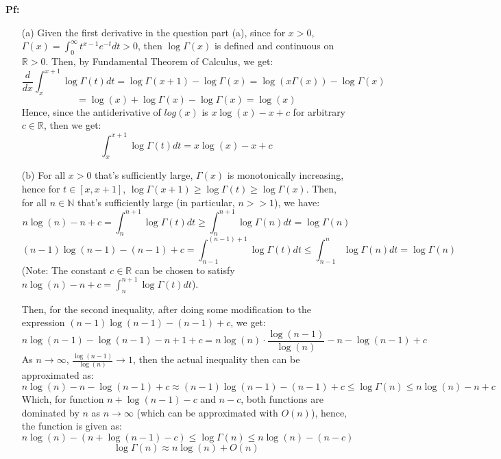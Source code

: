 \documentclass{article}
\begin{document}
\textbf{Pf:}

\begin{itemize}
    \item[(a)] Given the first derivative in the question part (a), since for $x>0$, $\Gamma(x)=\int_{0}^{\infty}t^{x-1}e^{-t}dt>0$, then $\log\Gamma(x)$ is defined and continuous on $\mathbb{R}>0$. Then, by Fundamental Theorem of Calculus, we get:
    $$\frac{d}{dx}\int_{x}^{x+1}\log\Gamma(t)dt = \log\Gamma(x+1)-\log\Gamma(x) = \log(x\Gamma(x))-\log\Gamma(x)$$
    $$= \log(x)+\log\Gamma(x)-\log\Gamma(x)=\log(x)$$
    Hence, since the antiderivative of $log(x)$ is $x\log(x)-x+c$ for arbitrary $c\in\mathbb{R}$, then we get:
    $$\int_{x}^{x+1}\log\Gamma(t)dt = x\log(x)-x+c$$
    \item[(b)] For all $x>0$ that's sufficiently large, $\Gamma(x)$ is monotonically increasing, hence for $t\in[x,x+1]$, $\log\Gamma(x+1)\geq\log\Gamma(t)\geq \log\Gamma(x)$. Then, for all $n\in\mathbb{N}$ that's sufficiently large (in particular, $n>>1$), we have:
    $$n\log(n)-n+c=\int_{n}^{n+1}\log\Gamma(t)dt\geq \int_{n}^{n+1}\log\Gamma(n)dt = \log\Gamma(n)$$
    $$(n-1)\log(n-1)-(n-1)+c=\int_{n-1}^{(n-1)+1}\log\Gamma(t)dt \leq \int_{n-1}^{n}\log\Gamma(n)dt=\log\Gamma(n)$$
    (Note: The constant $c\in\mathbb{R}$ can be chosen to satisfy $n\log(n)-n+c=\int_{n}^{n+1}\log\Gamma(t)dt$).

    Then, for the second inequality, after doing some modification to the expression $(n-1)\log(n-1)-(n-1)+c$, we get:
    $$n\log(n-1)-\log(n-1)-n+1+c = n\log(n)\cdot\frac{\log(n-1)}{\log(n)}-n-\log(n-1)+c$$
    As $n\rightarrow\infty$, $\frac{\log(n-1)}{\log(n)}\rightarrow 1$, then the actual inequality then can be approximated as:
    $$n\log(n)-n-\log(n-1)+c\approx (n-1)\log(n-1)-(n-1)+c\leq \log\Gamma(n)\leq n\log(n)-n+c$$
    Which, for function $n+\log(n-1)-c$ and $n-c$, both functions are dominated by $n$ as $n\rightarrow \infty$ (which can be approximated with $O(n)$), hence, the function is given as:
    $$n\log(n)-(n+\log(n-1)-c)\leq \log\Gamma(n)\leq n\log(n)-(n-c)$$
    $$\log\Gamma(n)\approx n\log(n)+O(n)$$
\end{itemize}

\break
\end{document}
